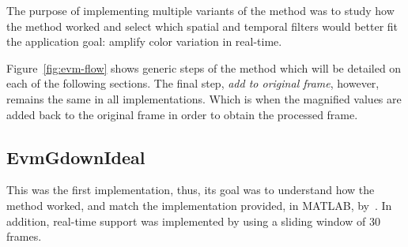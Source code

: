 The purpose of implementing multiple variants of the method was to study
how the method worked and select which spatial and temporal filters would
better fit the application goal: amplify color variation in real-time.

Figure~\ref{fig:evm-flow} shows generic steps of the method which will be
detailed on each of the following sections. The final step,
\emph{add to original frame}, however, remains the same in all
implementations. Which is when the magnified values are added back to the
original frame in order to obtain the processed frame.

\subsection{EvmGdownIdeal} \label{sec:impl:evm:gdownideal}

This was the first implementation, thus, its goal was to understand how the
method worked, and match the implementation provided, in MATLAB,
by~\cite{Wu2012Eulerian}. In addition, real-time support was implemented
by using a sliding window of $30$ frames.

